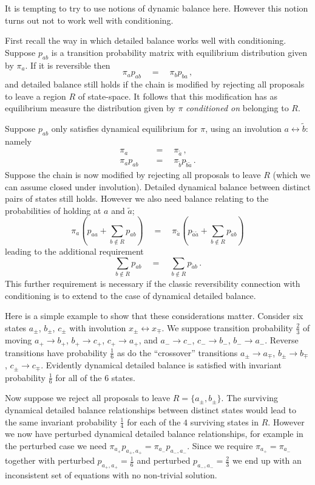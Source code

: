 \documentclass[]{article}
\begin{document}
\begin{NoteThis2}
It is tempting to try to use notions of 
dynamic balance here. However this notion
turns out not to work well with conditioning.


First recall the way in which detailed balance
works well with conditioning.
Suppose \(p_{ab}\) is a transition probability
matrix with equilibrium distribution given
by \(\pi_a\). If it is reversible then
\[
\pi_a p_{ab} \quad=\quad \pi_b p_{ba}\,,
\]
and detailed balance still holds
if the chain is modified
by rejecting all proposals to leave a region \(R\)
of state-space. It follows that this modification
has as equilibrium measure the 
distribution given by \(\pi\) 
\emph{conditioned on} belonging to \(R\).

Suppose \(p_{ab}\) only satisfies dynamical
equilibrium for \(\pi\), using an
involution \(a\leftrightarrow\widetilde{b}\):
namely
\begin{align*}
\pi_a \quad&=\quad \pi_{\widetilde{a}}\,,
\\
\pi_a p_{ab} \quad&=\quad 
\pi_{\widetilde{b}} p_{\widetilde{
b}\widetilde{a}} 
\,.
\end{align*}
Suppose the chain is now modified by rejecting 
all proposals to leave \(R\)
(which we can assume closed under involution).
Detailed dynamical
balance between distinct pairs of states
still holds. However we also need
balance relating to the probabilities
of holding at \(a\) and \(\widetilde{a}\);
\[
\pi_a \left(p_{aa} + \sum_{b\not\in R}p_{ab}\right)
\quad=\quad
\pi_{\widetilde{a}} \left(p_{\widetilde{a}\widetilde{a}} + \sum_{b\not\in R}p_{\widetilde{a}b}\right)
\]
leading to the additional requirement
\[
\sum_{b\not\in R}p_{ab}
\quad=\quad
\sum_{b\not\in R}p_{\widetilde{a}b}
\,.
\]
This further requirement is necessary if the classic reversibility connection with conditioning
is to extend to the case of dynamical detailed balance.

Here is a simple example to show 
that these considerations matter.
Consider six states \(a_\pm\), \(b_\pm\), \(c_\pm\)
with involution \(x_\pm\leftrightarrow x_\mp\).
We suppose transition probability \(\tfrac{2}{3}\) of moving
\(a_+\to b_+\),
\(b_+\to c_+\),
\(c_+\to a_+\),
and
\(a_-\to c_-\),
\(c_-\to b_-\),
\(b_-\to a_-\).
Reverse transitions have probability \(\tfrac{1}{6}\)
as do the ``crossover'' transitions
\(a_\pm\to a_\mp\),
\(b_\pm\to b_\mp\),
\(c_\pm\to c_\mp\).
Evidently dynamical detailed balance
is satisfied with invariant probability \(\tfrac{1}{6}\)
for all of the \(6\) states.

Now suppose we reject all proposals to leave 
\(R=\{a_\pm, b_\pm\}\).
The surviving dynamical detailed balance
relationships between distinct states
would lead to the same
invariant probability \(\tfrac{1}{4}\) for each of the \(4\) surviving states in \(R\).
However we now have perturbed dynamical
detailed balance relationships,
for example
in the perturbed case we need
\(\pi_{a_+} p_{a_+,a_+}=\pi_{a_-} p_{a_-,a_-}\).
Since we require
\(\pi_{a_+}=\pi_{a_-}\)
together with perturbed \(p_{a_+,a_+}=\tfrac{1}{6}\)
and perturbed \(p_{a_-,a_-}=\tfrac{2}{3}\)
we end up with an inconsistent set of equations
with no non-trivial solution.
\end{NoteThis2}
\end{document}
